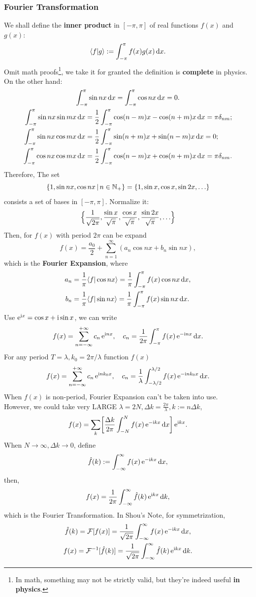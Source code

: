 \documentclass{article}
\begin{document}
\subsubsection{Fourier Transformation}
We shall define the \textbf{inner product} in $[-\pi,\pi]$ of real functions $f(x)$ and $g(x)$:
$$\langle f\vert g\rangle:=\int_{-\pi}^\pi f(x)g(x)\mathop{}\!\mathrm{d} x.$$
Omit math proofs\footnote{In math, something may not be strictly valid, but they're indeed useful \textbf{in physics}.}, we take it for granted the definition is \textbf{complete} in physics.\\
On the other hand:
\begin{gather*}
	\int_{-\pi}^\pi\sin nx\d x=\int_{-\pi}^\pi\cos nx\d x=0.\\
	\begin{aligned}
		\int_{-\pi}^\pi\sin nx\sin mx\d x & =\frac12\int_{-\pi}^\pi\cos(n-m)x-\cos(n+m)x\d x=\pi\delta_{nm}; \\
		\int_{-\pi}^\pi\sin nx\cos mx\d x & =\frac12\int_{-\pi}^\pi\sin(n+m)x+\sin(n-m)x\d x=0;              \\
		\int_{-\pi}^\pi\cos nx\cos mx\d x & =\frac12\int_{-\pi}^\pi\cos(n-m)x+\cos(n+m)x\d x=\pi\delta_{nm}.
	\end{aligned}
\end{gather*}
Therefore, The set
$$\{1,\sin nx,\cos nx\,|\,n\in\mathbb{N}_+\}=\{1,\sin x,\cos x,\sin2x,\ldots\}$$
consists a set of bases in $[-\pi,\pi]$. Normalize it:
$$\Bigl\{\frac1{\sqrt{2\pi}},\frac{\sin x}{\sqrt\pi},\frac{\cos x}{\sqrt\pi},\frac{\sin2x}{\sqrt\pi},\ldots\Bigr\}$$
Then, for $f(x)$ with period $2\pi$ can be expand
$$f(x)=\frac{a_0}2+\sum_{n=1}^\infty(a_n\cos nx+b_n\sin nx),$$
which is the \textbf{Fourier Expansion}, where
\begin{align*}
	a_n & =\frac1\pi\langle f\vert\cos nx\rangle=\frac1\pi\int_{-\pi}^\pi f(x)\cos nx\mathop{}\!\mathrm{d} x, \\
	b_n & =\frac1\pi\langle f\vert\sin nx\rangle=\frac1\pi\int_{-\pi}^\pi f(x)\sin nx\mathop{}\!\mathrm{d} x.
\end{align*}
Use $\mathop{}\!\mathrm{e}^{\mathrm{i} x}=\cos x+\mathrm{i}\sin x$, we can write
$$f(x)=\sum_{n=-\infty}^{+\infty}c_n\mathop{}\!\mathrm{e}^{\mathrm{i} nx},\quad c_n=\frac1{2\pi}\int_{-\pi}^\pi f(x)\mathop{}\!\mathrm{e}^{-\mathrm{i} nx}\mathop{}\!\mathrm{d} x.$$
For any period $T=\lambda, k_0=2\pi/\lambda$ function $f(x)$
$$f(x)=\sum_{n=-\infty}^{+\infty}c_n\mathop{}\!\mathrm{e}^{\mathrm{i} nk_0x},\quad c_n=\frac1\lambda\int_{-\lambda/2}^{\lambda/2} f(x)\mathop{}\!\mathrm{e}^{-\mathrm{i} nk_0x}\mathop{}\!\mathrm{d} x.$$
When $f(x)$ is non-period, Fourier Expansion can't be taken into use.\\
However, we could take very LARGE $\lambda=2N,\Delta k=\frac{2\pi}\lambda,k:=n\Delta k$,
$$f(x)=\sum_k\biggl[\frac{\Delta k}{2\pi}\int_{-N}^Nf(x)\mathop{}\!\mathrm{e}^{-\mathrm{i} kx}\mathop{}\!\mathrm{d} x\biggr]\mathop{}\!\mathrm{e}^{\mathrm{i} kx}.$$
When $N\to\infty,\Delta k\to0$, define
$$\hat f(k):=\int_{-\infty}^\infty f(x)\mathop{}\!\mathrm{e}^{-\mathrm{i} kx}\mathop{}\!\mathrm{d} x,$$
then,
$$f(x)=\frac1{2\pi}\int_{-\infty}^\infty\hat f(k)\mathop{}\!\mathrm{e}^{\mathrm{i} kx}\mathop{}\!\mathrm{d} k,$$
which is the Fourier Transformation. In Shou's Note, for symmetrization,
\begin{gather*}
	\hat f(k)=\operatorname{\mathcal{F}}[f(x)]=\frac1{\sqrt{2\pi}}\int_{-\infty}^\infty f(x)\mathop{}\!\mathrm{e}^{-\mathrm{i} kx}\mathop{}\!\mathrm{d} x,\\
	f(x)=\operatorname{\mathcal{F}}^{-1}[\hat f(k)]=\frac1{\sqrt{2\pi}}\int_{-\infty}^\infty \hat f(k)\mathop{}\!\mathrm{e}^{\mathrm{i} kx}\mathop{}\!\mathrm{d} k.
\end{gather*}
\end{document}
